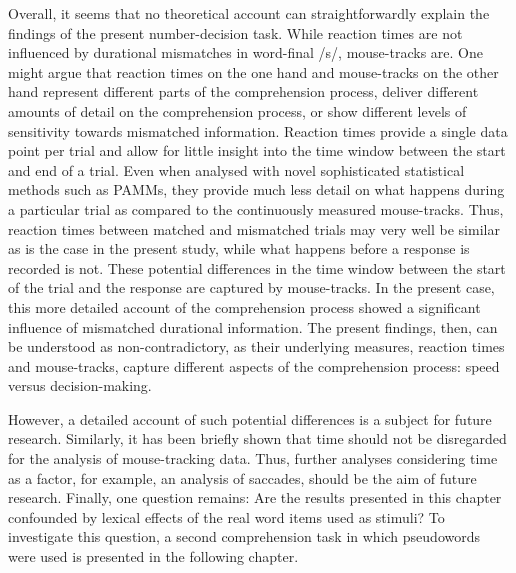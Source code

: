 Overall, it seems that no theoretical account can straightforwardly explain the findings of the present number-decision task. While reaction times are not influenced by durational mismatches in word-final /s/, mouse-tracks are. One might argue that reaction times on the one hand and mouse-tracks on the other hand represent different parts of the comprehension process, deliver different amounts of detail on the comprehension process, or show different levels of sensitivity towards mismatched information. Reaction times provide a single data point per trial and allow for little insight into the time window between the start and end of a trial. Even when analysed with novel sophisticated statistical methods such as PAMMs, they provide much less detail on what happens during a particular trial as compared to the continuously measured mouse-tracks. Thus, reaction times between matched and mismatched trials may very well be similar as is the case in the present study, while what happens before a response is recorded is not. These potential differences in the time window between the start of the trial and the response are captured by mouse-tracks. In the present case, this more detailed account of the comprehension process showed a significant influence of mismatched durational information. The present findings, then, can be understood as non-contradictory, as their underlying measures, reaction times and mouse-tracks, capture different aspects of the comprehension process: speed versus decision-making.

However, a detailed account of such potential differences is a subject for future research. Similarly, it has been briefly shown that time should not be disregarded for the analysis of mouse-tracking data. Thus, further analyses considering time as a factor, for example, an analysis of saccades, should be the aim of future research. Finally, one question remains: Are the results presented in this chapter confounded by lexical effects of the real word items used as stimuli? To investigate this question, a second comprehension task in which pseudowords were used is presented in the following chapter.
